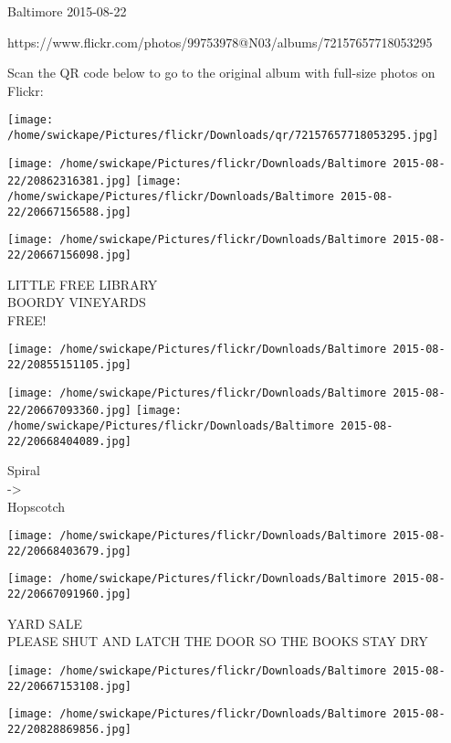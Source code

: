 \documentclass[10pt,letterpaper]{article}
\begin{document}
Baltimore 2015-08-22

https://www.flickr.com/photos/99753978@N03/albums/72157657718053295

Scan the QR code below to go to the original album with full-size photos on Flickr:

\texttt{[image: /home/swickape/Pictures/flickr/Downloads/qr/72157657718053295.jpg]}
\pagebreak

\texttt{[image: /home/swickape/Pictures/flickr/Downloads/Baltimore 2015-08-22/20862316381.jpg]}
\texttt{[image: /home/swickape/Pictures/flickr/Downloads/Baltimore 2015-08-22/20667156588.jpg]}

\vspace{0.25in}
\texttt{[image: /home/swickape/Pictures/flickr/Downloads/Baltimore 2015-08-22/20667156098.jpg]}

LITTLE FREE LIBRARY\\
BOORDY VINEYARDS\\
FREE!\\
\pagebreak

\texttt{[image: /home/swickape/Pictures/flickr/Downloads/Baltimore 2015-08-22/20855151105.jpg]}

\vspace{0.25in}
\texttt{[image: /home/swickape/Pictures/flickr/Downloads/Baltimore 2015-08-22/20667093360.jpg]}
\texttt{[image: /home/swickape/Pictures/flickr/Downloads/Baltimore 2015-08-22/20668404089.jpg]}

Spiral\\
{-}>\\
Hopscotch\\
\pagebreak

\texttt{[image: /home/swickape/Pictures/flickr/Downloads/Baltimore 2015-08-22/20668403679.jpg]}

\vspace{0.25in}
\texttt{[image: /home/swickape/Pictures/flickr/Downloads/Baltimore 2015-08-22/20667091960.jpg]}

YARD SALE\\
PLEASE SHUT AND LATCH THE DOOR SO THE BOOKS STAY DRY\\
\pagebreak

\texttt{[image: /home/swickape/Pictures/flickr/Downloads/Baltimore 2015-08-22/20667153108.jpg]}

\vspace{0.25in}
\texttt{[image: /home/swickape/Pictures/flickr/Downloads/Baltimore 2015-08-22/20828869856.jpg]}
\end{document}
